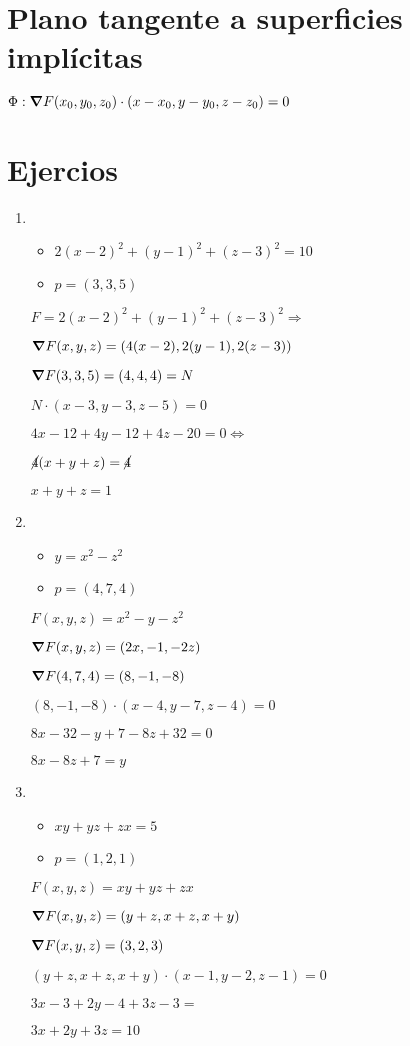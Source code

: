 \documentclass[../practica_04.tex]{subfiles}
\begin{document}
    \section*{Plano tangente a superficies implícitas}

    $\Phi : \grad F(x_0,y_0,z_0)\cdot(x-x_0,y-y_0,z-z_0) = 0$

    \section*{Ejercios}

    \begin{enumerate}
        \item
            \begin{itemize}
                \item $ 2(x-2)^2 + (y-1)^2 + (z-3)^2 = 10 $
                \item $ p = (3,3,5) $
            \end{itemize}

            $ F = 2(x-2)^2 + (y-1)^2 + (z-3)^2 \Rightarrow $

            $ \grad F(x,y,z) = (4(x-2), 2(y-1), 2(z-3)) $

            $ \grad F(3,3,5) = (4, 4, 4) = N $

            $ N\cdot(x-3,y-3,z-5) = 0 $

            $ 4x - 12 + 4y - 12 + 4z - 20 = 0 \Leftrightarrow$

            $ \cancel{4}(x + y +z) = \cancel{4} $

            $ x + y + z = 1 $

        \item
            \begin{itemize}
                \item $ y = x^2-z^2 $
                \item $ p = (4,7,4) $
            \end{itemize}

            $ F(x,y,z) = x^2 - y - z^2  $

            $ \grad F(x,y,z) = (2x, -1, -2z) $

            $ \grad F(4,7,4) = (8, -1, -8) $

            $ (8, -1, -8)\cdot(x-4,y-7,z-4) = 0 $

            $ 8x - 32 - y + 7 - 8z + 32 = 0 $

            $ 8x - 8z + 7 = y $

        \item
            \begin{itemize}
                \item $ xy + yz + zx = 5 $
                \item $ p = (1,2,1) $
            \end{itemize}

            $ F(x,y,z) = xy + yz + zx $ 

            $ \grad F(x,y,z) = ( y + z, x + z, x + y) $

            $ \grad F(x,y,z) = (3, 2, 3) $

            $ (y+z, x+z, x+y)\cdot(x-1,y-2,z-1) = 0 $

            $ 3x - 3 + 2y - 4 + 3z - 3 =  $

            $ 3x + 2y + 3z = 10 $

    \end{enumerate}
\end{document}
